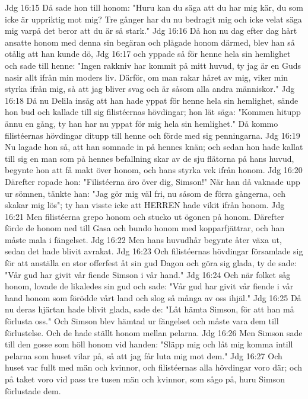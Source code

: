 Jdg 16:15  Då sade hon till honom: "Huru kan du säga att du har mig kär, du som icke är uppriktig mot mig? Tre gånger har du nu bedragit mig och icke velat säga mig varpå det beror att du är så stark."
Jdg 16:16  Då hon nu dag efter dag hårt ansatte honom med denna sin begäran och plågade honom därmed, blev han så otålig att han kunde dö,
Jdg 16:17  och yppade så för henne hela sin hemlighet och sade till henne: "Ingen rakkniv har kommit på mitt huvud, ty jag är en Guds nasir allt ifrån min moders liv. Därför, om man rakar håret av mig, viker min styrka ifrån mig, så att jag bliver svag och är såsom alla andra människor."
Jdg 16:18  Då nu Delila insåg att han hade yppat för henne hela sin hemlighet, sände hon bud och kallade till sig filistéernas hövdingar; hon lät säga: "Kommen hitupp ännu en gång, ty han har nu yppat för mig hela sin hemlighet." Då kommo filistéernas hövdingar ditupp till henne och förde med sig penningarna.
Jdg 16:19  Nu lagade hon så, att han somnade in på hennes knän; och sedan hon hade kallat till sig en man som på hennes befallning skar av de sju flätorna på hans huvud, begynte hon att få makt över honom, och hans styrka vek ifrån honom.
Jdg 16:20  Därefter ropade hon: "Filistéerna äro över dig, Simson!" När han då vaknade upp ur sömnen, tänkte han: "Jag gör mig väl fri, nu såsom de förra gångerna, och skakar mig lös"; ty han visste icke att HERREN hade vikit ifrån honom.
Jdg 16:21  Men filistéerna grepo honom och stucko ut ögonen på honom. Därefter förde de honom ned till Gasa och bundo honom med kopparfjättrar, och han måste mala i fängelset.
Jdg 16:22  Men hans huvudhår begynte åter växa ut, sedan det hade blivit avrakat.
Jdg 16:23  Och filistéernas hövdingar församlade sig för att anställa en stor offerfest åt sin gud Dagon och göra sig glada, ty de sade: "Vår gud har givit vår fiende Simson i vår hand."
Jdg 16:24  Och när folket såg honom, lovade de likaledes sin gud och sade: "Vår gud har givit vår fiende i vår hand honom som förödde vårt land och slog så många av oss ihjäl."
Jdg 16:25  Då nu deras hjärtan hade blivit glada, sade de: "Låt hämta Simson, för att han må förlusta oss." Och Simson blev hämtad ur fängelset och måste vara dem till förlustelse. Och de hade ställt honom mellan pelarna.
Jdg 16:26  Men Simson sade till den gosse som höll honom vid handen: "Släpp mig och låt mig komma intill pelarna som huset vilar på, så att jag får luta mig mot dem."
Jdg 16:27  Och huset var fullt med män och kvinnor, och filistéernas alla hövdingar voro där; och på taket voro vid pass tre tusen män och kvinnor, som sågo på, huru Simson förlustade dem.

